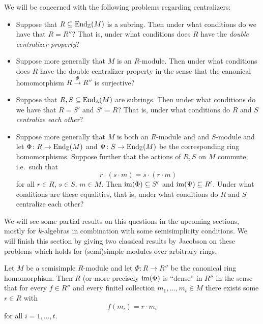 \begin{fluff}
  We will be concerned with the following problems regarding centralizers:
  \begin{itemize}
    \item
      Suppose that $R \subseteq \operatorname{End}_{\mathbb{Z}}(M)$ is a subring.
      Then under what conditions do we have that $R = R''$?
      That is, under what conditions does $R$ have the \emph{double centralizer property}?
    \item
      Suppose more generally that $M$ is an $R$-module.
      Then under what conditions does $R$ have the double centralizer property in the sense that the canonical homomorphism $R \xrightarrow{\Phi} R''$ is surjective?
    \item
      Suppose that $R, S \subseteq \operatorname{End}_{\mathbb{Z}}(M)$ are subrings.
      Then under what conditions do we have that $R = S'$ and $S' = R$?
      That is, under what conditions do $R$ and $S$ \emph{centralize each other}?
    \item
      Suppose more generally that $M$ is both an $R$-module and and $S$-module and let $\Phi \colon R \to \operatorname{End}_{\mathbb{Z}}(M)$ and $\Psi \colon S \to \operatorname{End}_{\mathbb{Z}}(M)$ be the corresponding ring homomorphisms.
      Suppose further that the actions of $R, S$ on $M$ commute, i.e.\ such that
      \[
          r \cdot (s \cdot m)
        = s \cdot (r \cdot m)
      \]
      for all $r \in R$, $s \in S$, $m \in M$.
      Then $\operatorname{im}(\Phi) \subseteq S'$ and $\operatorname{im}(\Psi) \subseteq R'$.
      Under what conditions are these equalities, that is, under what conditions do $R$ and $S$ centralize each other?
  \end{itemize}
  
  We will see some partial results on this questions in the upcoming sections, mostly for $k$-algebras in combination with some semisimplicity conditions.
  We will finish this section by giving two classical results by Jacobson on these problems which holds for (semi)simple modules over arbitrary rings.
\end{fluff}


\begin{theorem}
  Let $M$ be a semisimple $R$-module and let $\Phi \colon R \to R''$ be the canonical ring homomorphism.
  Then $R$ (or more precisely $\operatorname{im}(\Phi)$ is \enquote{dense} in $R''$ in the sense that for every $f \in R''$ and every finitel collection $m_1, \dotsc, m_t \in M$ there exists some $r \in R$ with
  \[
      f(m_i)
    = r \cdot m_i
  \]
  for all $i = 1, \dotsc, t$.
\end{theorem}


